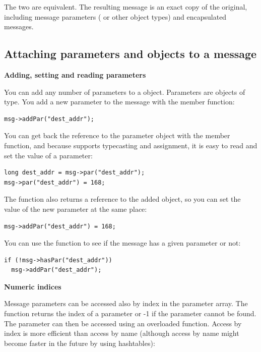 The two are equivalent. The resulting message is an exact copy 
of the original, including message parameters ( or other 
object types) and encapsulated messages.





\subsection{Attaching parameters and objects to a message}

\textbf{Adding, setting and reading parameters}


You can add any number of parameters to a 
object.  Parameters are objects of
 type. You add a new parameter to the message with the
 member function:

\begin{Verbatim}
msg->addPar("dest_addr");
\end{Verbatim}

You can get back the reference to the parameter
object with the 
member function, and because  supports typecasting and
assignment, it is easy to read and set the value of a parameter:

\begin{Verbatim}
long dest_addr = msg->par("dest_addr");
msg->par("dest_addr") = 168;
\end{Verbatim}


The  function also returns a reference to the added
 object, so you can set the value of the new parameter at
the same place:

\begin{Verbatim}
msg->addPar("dest_addr") = 168;
\end{Verbatim}

You can use the  function to see if the message has a 
given parameter or not:

\begin{Verbatim}
if (!msg->hasPar("dest_addr")) 
  msg->addPar("dest_addr");
\end{Verbatim}


\textbf{Numeric indices}


Message parameters can be accessed also by index in the parameter
array. The  function returns the index of a parameter
or -1 if the parameter cannot be found. The parameter can then be
accessed using an overloaded  function. Access by index
is more efficient than access by name (although access by name might
become faster in the future by using hashtables):

